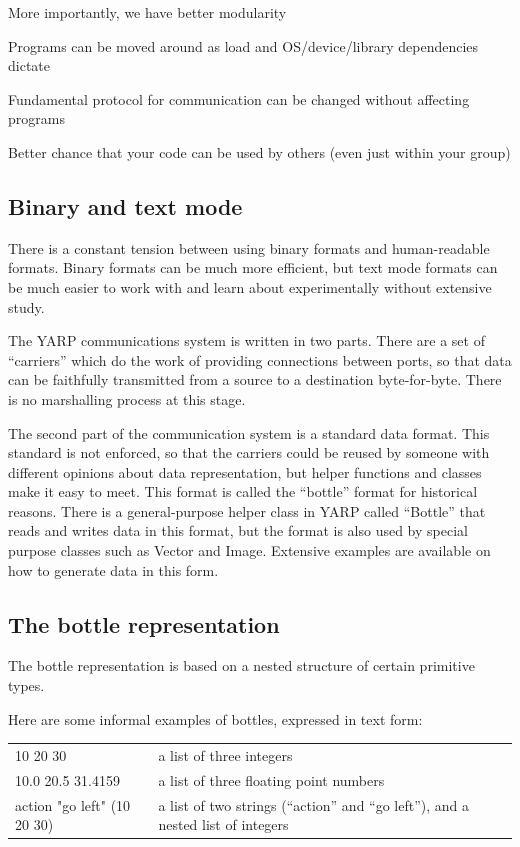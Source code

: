 More importantly, we have better modularity

Programs can be moved around as load and OS/device/library
 dependencies dictate

Fundamental protocol for communication can be changed without 
affecting programs

Better chance that your code can be used by others (even just within 
your group)



\subsection{Binary and text mode}

There is a constant tension between using binary formats and
human-readable formats.  Binary formats can be much more efficient,
but text mode formats can be much easier to work with and learn about
experimentally without extensive study.

The YARP communications system is written in two parts.  There
are a set of ``carriers'' which do the work of providing
connections between ports, so that data can be faithfully 
transmitted from a source to a destination byte-for-byte.
There is no marshalling process at this stage.

The second part of the communication system is a standard data format.
This standard is not enforced, so that the carriers could be reused by
someone with different opinions about data representation, but helper
functions and classes make it easy to meet.  This format is called the
``bottle'' format for historical reasons.  There is a general-purpose
helper class in YARP called ``Bottle'' that reads and writes data in
this format, but the format is also used by special purpose classes
such as Vector and Image.  Extensive examples are available on how
to generate data in this form.

\subsection{The bottle representation}

The bottle representation is based on a nested structure of certain
primitive types.  

Here are some informal examples of bottles, expressed in text form:

\begin{tabular}{p{5cm}p{6cm}}
10 20 30 & a list of three integers \\
10.0 20.5 31.4159 & a list of three floating point numbers \\
action "go left" (10 20 30) & a list of two strings (``action'' and ``go left''), and a nested list of integers
\end{tabular}

